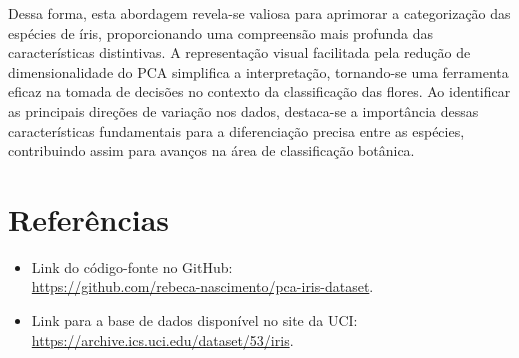 \documentclass{article}
\begin{document}
Dessa forma, esta abordagem revela-se valiosa para aprimorar a categorização das espécies de íris, proporcionando uma compreensão mais profunda das características distintivas. A representação visual facilitada pela redução de dimensionalidade do PCA simplifica a interpretação, tornando-se uma ferramenta eficaz na tomada de decisões no contexto da classificação das flores. Ao identificar as principais direções de variação nos dados, destaca-se a importância dessas características fundamentais para a diferenciação precisa entre as espécies, contribuindo assim para avanços na área de classificação botânica.

\vspace*{1cm}

\section*{Referências}
\begin{itemize}
\item Link do código-fonte no GitHub:\\ \url{https://github.com/rebeca-nascimento/pca-iris-dataset}. \\
\item Link para a base de dados disponível no site da UCI:\\ \url{https://archive.ics.uci.edu/dataset/53/iris}.
\end{itemize}
\end{document}
